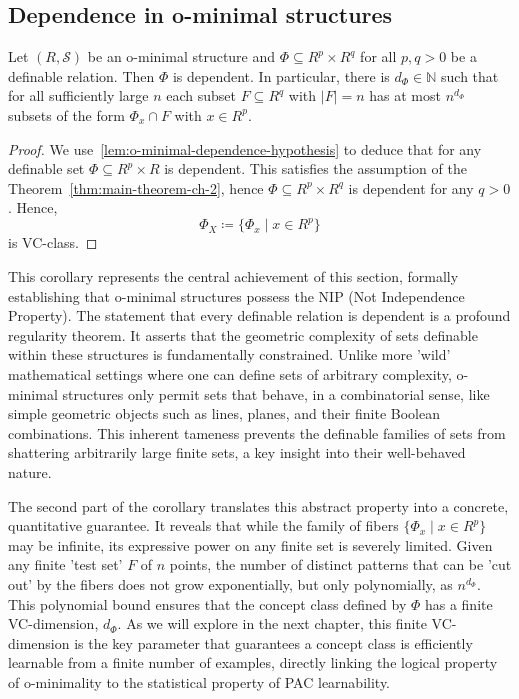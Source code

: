 \subsection{Dependence in o-minimal structures}



\begin{corollary}
    Let $(R, \mathcal{S})$ be an o-minimal structure and $\Phi \subseteq R^{p} \times R^q$ for all $p, q > 0$ be a definable relation. Then $\Phi$ is dependent. In particular, there is $d_{\Phi} \in \mathbb{N}$ such that for all sufficiently large $n$ each subset $F \subseteq R^q$ with $|F| = n$ has at most $n^{d_{\Phi}}$ subsets of the form $\Phi_{x} \cap F$ with $x \in R^p$.
\end{corollary}

\begin{proof}

    We use~\ref{lem:o-minimal-dependence-hypothesis} to deduce that for any definable set $\Phi \subseteq R^{p}\times R $ is dependent. This satisfies the assumption of the Theorem~\ref{thm:main-theorem-ch-2}, hence $\Phi \subseteq R^{p}\times R^{q}$ is dependent for any $q > 0$. Hence,
    \[
        \Phi_{X} \coloneq \{\Phi_x \mid  x \in R^p\}
    \]
    is VC-class.
\end{proof}

This corollary represents the central achievement of this section, formally establishing that o-minimal structures possess the NIP (Not Independence Property). The statement that every definable relation is dependent is a profound regularity theorem. It asserts that the geometric complexity of sets definable within these structures is fundamentally constrained. Unlike more 'wild' mathematical settings where one can define sets of arbitrary complexity, o-minimal structures only permit sets that behave, in a combinatorial sense, like simple geometric objects such as lines, planes, and their finite Boolean combinations. This inherent tameness prevents the definable families of sets from shattering arbitrarily large finite sets, a key insight into their well-behaved nature.

The second part of the corollary translates this abstract property into a concrete, quantitative guarantee. It reveals that while the family of fibers $\{\Phi_x \mid x \in R^p\}$ may be infinite, its expressive power on any finite set is severely limited. Given any finite 'test set' $F$ of $n$ points, the number of distinct patterns that can be 'cut out' by the fibers does not grow exponentially, but only polynomially, as $n^{d_\Phi}$. This polynomial bound ensures that the concept class defined by $\Phi$ has a finite VC-dimension, $d_\Phi$. As we will explore in the next chapter, this finite VC-dimension is the key parameter that guarantees a concept class is efficiently learnable from a finite number of examples, directly linking the logical property of o-minimality to the statistical property of PAC learnability.